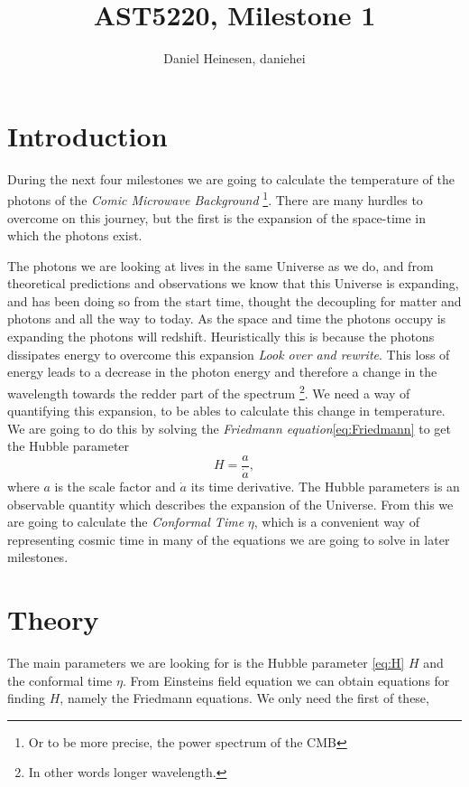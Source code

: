 \documentclass[a4paper,norsk, 10pt]{article}
\title{AST5220, Milestone 1}
\author{Daniel Heinesen, daniehei}
\begin{document}
\maketitle

\section{Introduction}
During the next four milestones we are going to calculate the temperature of the photons of the \textit{Comic Microwave Background} \footnote{Or to be more precise, the power spectrum of the CMB}. There are many hurdles to overcome on this journey, but the first is the expansion of the space-time in which the photons exist.

The photons we are looking at lives in the same Universe as we do, and from theoretical predictions and observations we know that this Universe is expanding, and has been doing so from the start time, thought the decoupling for matter and photons and all the way to today. As the space and time the photons occupy is expanding the photons will redshift. Heuristically this is because the photons dissipates energy to overcome this expansion \emph{Look over and rewrite}. This loss of energy leads to a decrease in the photon energy and therefore a change in the wavelength towards the redder part of the spectrum \footnote{In other words longer wavelength.}. 
We need a way of quantifying this expansion, to be ables to calculate this change in temperature. We are going to do this by solving the \textit{Friedmann equation}\eqref{eq:Friedmann} to get the Hubble parameter
\begin{equation}\label{eq:H}
H = \frac{a}{\dot{a}},
\end{equation}
where $a$ is the scale factor and $\dot{a}$ its time derivative. The Hubble parameters is an observable quantity which describes the expansion of the Universe. From this we are going to calculate the \textit{Conformal Time} $\eta$, which is a convenient way of representing cosmic time in many of the equations we are going to solve in later milestones.


\section{Theory}
The main parameters we are looking for is the Hubble parameter \eqref{eq:H} $H$ and the conformal time $\eta$. From Einsteins field equation we can obtain equations for finding $H$, namely the Friedmann equations. We only need the first of these,
\end{document}
